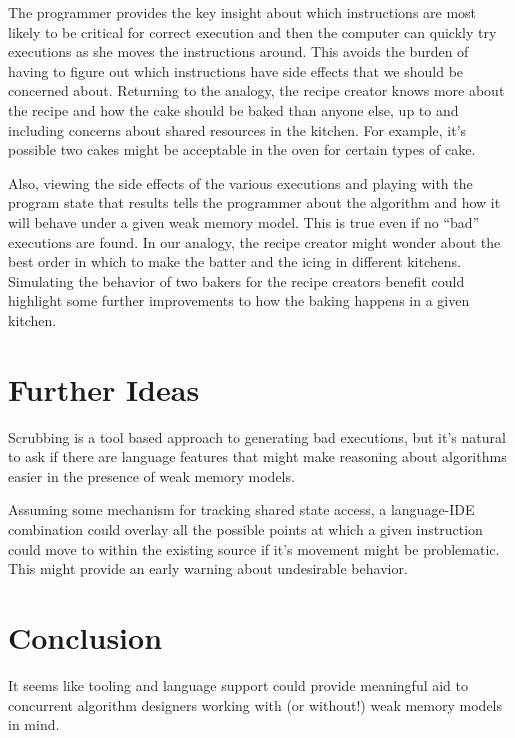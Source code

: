 \documentclass[9pt,twocolumn]{extarticle}
\begin{document}
The programmer provides the key insight about which instructions are most likely to be critical for correct execution and then the computer can quickly try executions as she moves the instructions around. This avoids the burden of having to figure out which instructions have side effects that we should be concerned about. Returning to the analogy, the recipe creator knows more about the recipe and how the cake should be baked than anyone else, up to and including concerns about shared resources in the kitchen. For example, it's possible two cakes might be acceptable in the oven for certain types of cake.

Also, viewing the side effects of the various executions and playing with the program state that results tells the programmer about the algorithm and how it will behave under a given weak memory model. This is true even if no ``bad'' executions are found. In our analogy, the recipe creator might wonder about the best order in which to make the batter and the icing in different kitchens. Simulating the behavior of two bakers for the recipe creators benefit could highlight some further improvements to how the baking happens in a given kitchen.

\vspace{-0.25cm}
\section{Further Ideas}
\vspace{-0.25cm}

Scrubbing is a tool based approach to generating bad executions, but it's natural to ask if there are language features that might make reasoning about algorithms easier in the presence of weak memory models.

Assuming some mechanism for tracking shared state access, a language-IDE combination could overlay all the possible points at which a given instruction could move to within the existing source if it's movement might be problematic. This might provide an early warning about undesirable behavior.

\vspace{-0.25cm}
\section{Conclusion}
\vspace{-0.25cm}

It seems like tooling and language support could provide meaningful aid to concurrent algorithm designers working with (or without!) weak memory models in mind.
\end{document}
